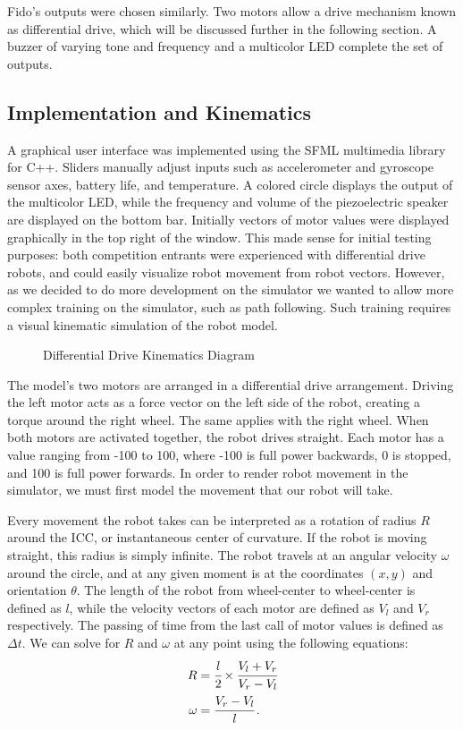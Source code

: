 Fido's outputs were chosen similarly.  Two motors allow a drive mechanism known as differential drive, which will be discussed further in the following section.  A buzzer of varying tone and frequency and a multicolor LED complete the set of outputs.  

\subsection{Implementation and Kinematics}

A graphical user interface was implemented using the SFML multimedia library for C++.  Sliders manually adjust inputs such as accelerometer and gyroscope sensor axes, battery life, and temperature.  A colored circle displays the output of the multicolor LED, while the frequency and volume of the piezoelectric speaker are displayed on the bottom bar.   Initially vectors of motor values were displayed graphically in the top right of the window.  This made sense for initial testing purposes: both competition entrants were experienced with differential drive robots, and could easily visualize robot movement from robot vectors.  However, as we decided to do more development on the simulator we wanted to allow more complex training on the simulator, such as path following.  Such training requires a visual kinematic simulation of the robot model.

\begin{figure}[ht]
	\centering
	
	\caption{Differential Drive Kinematics Diagram}
\end{figure}

The model's two motors are arranged in a differential drive arrangement.  Driving the left motor acts as a force vector on the left side of the robot, creating a torque around the right wheel.  The same applies with the right wheel.  When both motors are activated together, the robot drives straight.  Each motor has a value ranging from -100 to 100, where -100 is full power backwards, 0 is stopped, and 100 is full power forwards.   In order to render robot movement in the simulator, we must first model the movement that our robot will take.

Every movement the robot takes can be interpreted as a rotation of radius $R$ around the ICC, or instantaneous center of curvature.   If the robot is moving straight, this radius is simply infinite.   The robot travels at an angular velocity $\omega$ around the circle, and at any given moment is at the coordinates $(x,y)$ and orientation $\theta$.  The length of the robot from wheel-center to wheel-center is defined as $l$, while the velocity vectors of each motor are defined as $V_l$ and $V_r$ respectively.  The passing of time from the last call of motor values is defined as $\Delta t$.  We can solve for $R$ and $\omega$ at any point using the following equations:
\begin{align*}
	R &= \cfrac{l}{2} \times \cfrac{V_l + V_r}{V_r - V_l}\\
	\omega &= \cfrac{V_r - V_l}{l}\,.
\end{align*}


